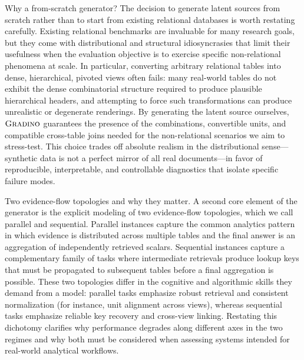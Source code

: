 \documentclass[11pt]{article}
\newcommand{\name}{$\textsc{Gradino}$\xspace}
\begin{document}
Why a from-scratch generator? The decision to generate latent sources from scratch rather than to start from existing relational databases is worth restating carefully. Existing relational benchmarks are invaluable for many research goals, but they come with distributional and structural idiosyncrasies that limit their usefulness when the evaluation objective is to exercise specific non-relational phenomena at scale. In particular, converting arbitrary relational tables into dense, hierarchical, pivoted views often fails: many real-world tables do not exhibit the dense combinatorial structure required to produce plausible hierarchical headers, and attempting to force such transformations can produce unrealistic or degenerate renderings. By generating the latent source ourselves, \name{} guarantees the presence of the combinations, convertible units, and compatible cross-table joins needed for the non-relational scenarios we aim to stress-test. This choice trades off absolute realism in the distributional sense—synthetic data is not a perfect mirror of all real documents—in favor of reproducible, interpretable, and controllable diagnostics that isolate specific failure modes.

Two evidence-flow topologies and why they matter. A second core element of the generator is the explicit modeling of two evidence-flow topologies, which we call parallel and sequential. Parallel instances capture the common analytics pattern in which evidence is distributed across multiple tables and the final answer is an aggregation of independently retrieved scalars. Sequential instances capture a complementary family of tasks where intermediate retrievals produce lookup keys that must be propagated to subsequent tables before a final aggregation is possible. These two topologies differ in the cognitive and algorithmic skills they demand from a model: parallel tasks emphasize robust retrieval and consistent normalization (for instance, unit alignment across views), whereas sequential tasks emphasize reliable key recovery and cross-view linking. Restating this dichotomy clarifies why performance degrades along different axes in the two regimes and why both must be considered when assessing systems intended for real-world analytical workflows.
\end{document}
